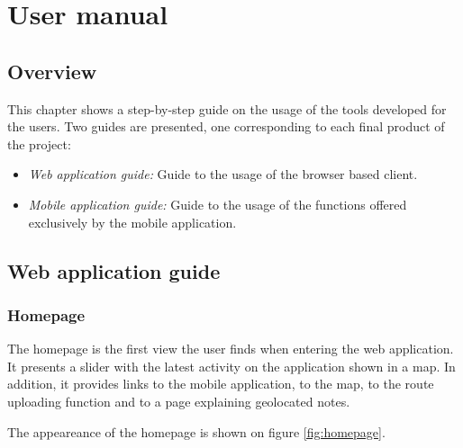 \chapter{User manual}\label{ch:user-guide}

\section{Overview}

This chapter shows a step-by-step guide on the usage of the tools developed for the users. Two guides are presented, one corresponding to each final product of the project:

\begin{itemize}
\item \textit{Web application guide:} Guide to the usage of the browser based client.

\item \textit{Mobile application guide:} Guide to the usage of the functions offered exclusively by the mobile application.
\end{itemize}

\section{Web application guide}

\subsection{Homepage}

The homepage is the first view the user finds when entering the web application. It presents a slider with the latest activity on the application shown in a map. In addition, it provides links to the mobile application, to the map, to the route uploading function and to a page explaining geolocated notes.

The appeareance of the homepage is shown on figure \ref{fig:homepage}.

